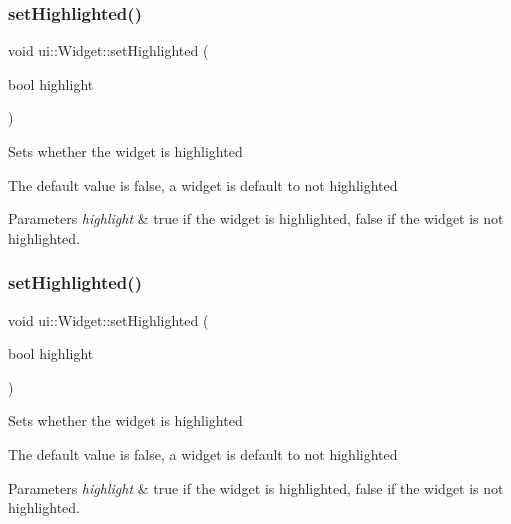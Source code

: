 \subsubsection{\texorpdfstring{set\+Highlighted()}{setHighlighted()}\hspace{0.1cm}{\footnotesize\ttfamily [1/2]}}
{\footnotesize\ttfamily void ui\+::\+Widget\+::set\+Highlighted (\begin{DoxyParamCaption}\item[{bool}]{highlight }\end{DoxyParamCaption})}

Sets whether the widget is highlighted

The default value is false, a widget is default to not highlighted


\begin{DoxyParams}{Parameters}
{\em highlight} & true if the widget is highlighted, false if the widget is not highlighted. \\
\hline
\end{DoxyParams}
\mbox{\label{classui_1_1Widget_ad18c81cef2447dcfb59b7f4250b0eeeb}} 
\subsubsection{\texorpdfstring{set\+Highlighted()}{setHighlighted()}\hspace{0.1cm}{\footnotesize\ttfamily [2/2]}}
{\footnotesize\ttfamily void ui\+::\+Widget\+::set\+Highlighted (\begin{DoxyParamCaption}\item[{bool}]{highlight }\end{DoxyParamCaption})}

Sets whether the widget is highlighted

The default value is false, a widget is default to not highlighted


\begin{DoxyParams}{Parameters}
{\em highlight} & true if the widget is highlighted, false if the widget is not highlighted. \\
\hline
\end{DoxyParams}
\mbox{\label{classui_1_1Widget_a28a78caf974c170fce6ef1742d517fae}} 
